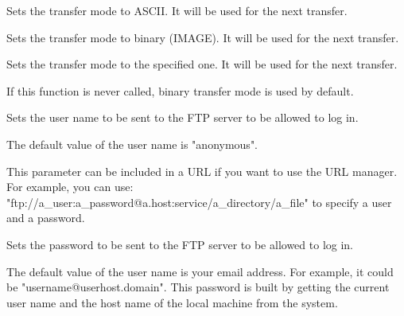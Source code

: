 


Sets the transfer mode to ASCII. It will be used for the next transfer.



Sets the transfer mode to binary (IMAGE). It will be used for the next transfer.



Sets the transfer mode to the specified one. It will be used for the next
transfer.

If this function is never called, binary transfer mode is used by default.




Sets the user name to be sent to the FTP server to be allowed to log in.


The default value of the user name is "anonymous".


This parameter can be included in a URL if you want to use the URL manager.
For example, you can use: "ftp://a\_user:a\_password@a.host:service/a\_directory/a\_file"
to specify a user and a password.



Sets the password to be sent to the FTP server to be allowed to log in.


The default value of the user name is your email address. For example, it could
be "username@userhost.domain". This password is built by getting the current
user name and the host name of the local machine from the system.


